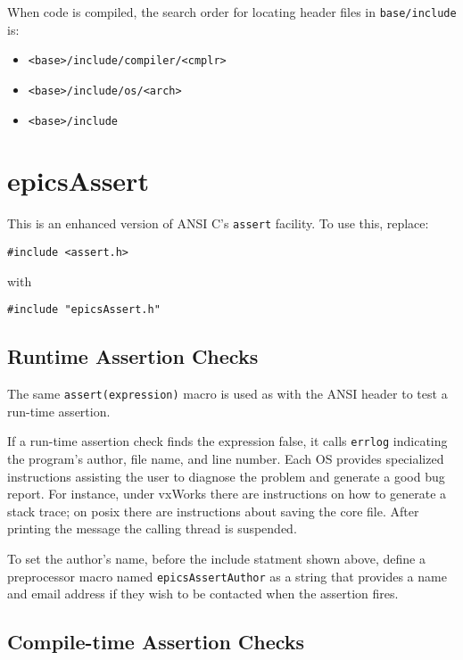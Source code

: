 When code is compiled, the search order for locating header files in \verb|base/include| is:

\begin{itemize}
\item \verb|<base>/include/compiler/<cmplr>|
\item \verb|<base>/include/os/<arch>|
\item \verb|<base>/include|

\end{itemize}

\section{epicsAssert}

This is an enhanced version of ANSI C's \verb|assert| facility. To use this, replace:

\begin{verbatim}
#include <assert.h>
\end{verbatim}

with

\begin{verbatim}
#include "epicsAssert.h"
\end{verbatim}

\subsection{Runtime Assertion Checks}

The same \verb|assert(expression)| macro is used as with the ANSI header to test a run-time assertion.

If a run-time assertion check finds the expression false, it calls \verb|errlog| indicating the program's author, file name, and line number.
Each OS provides specialized instructions assisting the user to diagnose the problem and generate a good bug report.
For instance, under vxWorks there are instructions on how to generate a stack trace; on posix there are instructions about saving the core file.
After printing the message the calling thread is suspended.

To set the author's name, before the include statment shown above, define a preprocessor macro named \verb|epicsAssertAuthor| as a string that provides a name and email address if they wish to be contacted when the assertion fires.

\subsection{Compile-time Assertion Checks}

